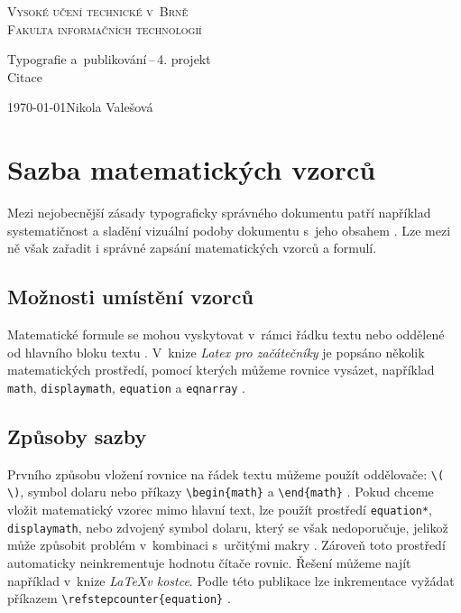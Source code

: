 \documentclass[a4paper,11pt]{article}
\begin{document}
\begin{titlepage}
	\centering
	{\textsc{\Huge Vysoké učení technické v~Brně\\ \vspace{2.5mm}
	\huge Fakulta informačních technologií}}


	{\LARGE Typografie a~publikování\,--\,4. projekt\\ \vspace{2mm}
	\Huge Citace}


	{\Large \today \hfill Nikola Valešová }
\end{titlepage}


\section*{Sazba matematických vzorců}

Mezi nejobecnější zásady typograficky správného dokumentu patří například systematičnost a sladění vizuální podoby dokumentu s~jeho obsahem \cite{Sirucek:Pravidla_ceske_digitani_typografie}. Lze mezi ně však zařadit i správné zapsání matematických vzorců a formulí.

\subsection*{Možnosti umístění vzorců}

Matematické formule se mohou vyskytovat v~rámci řádku textu nebo oddělené od hlavního bloku textu \cite{Helmut_Daly:Guide_to_Latex}. V~knize \emph{Latex pro začátečníky} je popsáno několik matematických prostředí, pomocí kterých můžeme rovnice vysázet, například \texttt{math}, \texttt{displaymath}, \texttt{equation} a \texttt{eqnarray} \cite{Rybicka:Latex_pro_zacatecniky}.

\subsection*{Způsoby sazby}

Prvního způsobu vložení rovnice na řádek textu můžeme použít oddělovače: \verb|\( \)|, symbol dolaru nebo příkazy \verb|\begin{math}| a \verb|\end{math}| \cite{Mathematical_expressions}. Pokud chceme vložit matematický vzorec mimo hlavní text, lze použít prostředí \texttt{equation*}, \texttt{displaymath}, nebo zdvojený symbol dolaru, který se však nedoporučuje, jelikož může způsobit problém v~kombinaci s~určitými makry \cite{Wikibooks}. Zároveň toto prostředí automaticky neinkrementuje hodnotu čítače rovnic. Řešení můžeme najít například v~knize \emph{\LaTeX v kostce}. Podle této publikace lze inkrementace vyžádat příkazem \verb|\refstepcounter{equation}| \cite{Sopuch:LaTeX_v_kostce}.
\end{document}
